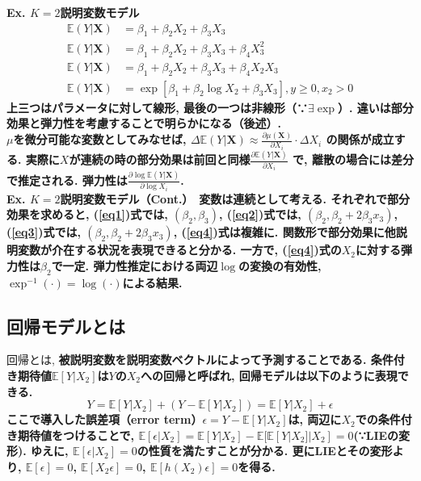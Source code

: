 \documentclass[paper=a4paper,fontsize=10pt]{jlreq}
\begin{document}
\rmfamily\mcfamily\bfseries{Ex. $K=2$説明変数モデル}\mdseries　
\begin{align}
  \label{eq1}
  \mathbb{E}(Y|\mathbf{X})&=\beta_1+\beta_2X_{2}+\beta_3X_{3}\\
  \label{eq2}
  \mathbb{E}(Y|\mathbf{X})&=\beta_1+\beta_2X_{2}+\beta_3X_{3}+\beta_4X_{3}^{2}\\
  \label{eq3}
  \mathbb{E}(Y|\mathbf{X})&=\beta_1+\beta_2X_{2}+\beta_3X_{3}+\beta_4X_{2}X_{3}\\
  \label{eq4}
  \mathbb{E}(Y|\mathbf{X})&=\exp[\beta_1+\beta_2\log X_{2}+\beta_3X_{3}], y ≥ 0, x_{2} > 0
\end{align}
上三つは\rmfamily\mcfamily\bfseries{パラメータに対して線形}\mdseries , 最後の一つは非線形（∵$\exists\exp$）. 違いは部分効果と弾力性を考慮することで明らかになる（後述）.\\

$\mu$を微分可能な変数としてみなせば, $\Delta\mathbb{E}(Y|\mathbf{X})\approx \frac{\partial \mu(\mathbf{X})}{\partial X_i}\cdot \Delta X_i$ の関係が成立する. 実際に$X$が連続の時の部分効果は前回と同様$\frac{\partial \mathbb{E}(Y|\mathbf{X})}{\partial X_i}$ で, 離散の場合には差分で推定される. 弾力性は$\frac{\partial \log \mathbb{E}(Y|\mathbf{X})}{\partial \log X_i}$.\\

\rmfamily\mcfamily\bfseries{Ex. $K=2$説明変数モデル（Cont.）}\mdseries　変数は連続として考える. それぞれで部分効果を求めると, (\ref{eq1})式では, $(\beta_2, \beta_3)$, (\ref{eq2})式では, $(\beta_2, \beta_2+2\beta_3x_3)$, (\ref{eq3})式では, $(\beta_2, \beta_2+2\beta_3x_3)$, (\ref{eq4})式は複雑に. 関数形で部分効果に他説明変数が介在する状況を表現できると分かる. 一方で,  (\ref{eq4})式の$X_2$に対する弾力性は$\beta_2$で一定. 弾力性推定における両辺$\log$の変換の有効性, $\exp^{-1}(\cdot)=\log(\cdot)$による結果.\\

\subsection{回帰モデルとは}
回帰とは,  \rmfamily\mcfamily\bfseries{被説明変数を説明変数ベクトルによって予測}\mdseries することである. 条件付き期待値$\mathbb{E}[Y|X_{2}]$は\rmfamily\mcfamily\bfseries{$Y$の$X_{2}$への回帰}\mdseries と呼ばれ, 回帰モデルは以下のように表現できる. 
\begin{equation*}
  Y = \mathbb{E}[Y|X_{2}]+(Y-\mathbb{E}[Y|X_{2}])=\mathbb{E}[Y|X_{2}]+\epsilon
\end{equation*}
ここで導入した\rmfamily\mcfamily\bfseries{誤差項（error term）}\mdseries $\epsilon=Y-\mathbb{E}[Y|X_{2}]$は, 両辺に$X_{2}$での条件付き期待値をつけることで, $\mathbb{E}[\epsilon|X_{2}]=\mathbb{E}[Y|X_{2}]-\mathbb{E}[\mathbb{E}[Y|X_{2}]|X_{2}]=0$(∵LIEの変形). ゆえに, $\mathbb{E}[\epsilon|X_{2}]=0$の性質を満たすことが分かる. 更にLIEとその変形より, $\mathbb{E}[\epsilon]=0$, $\mathbb{E}[X_{2}\epsilon]=0$, $\mathbb{E}[h(X_{2})\epsilon]=0$を得る.\\
\end{document}
